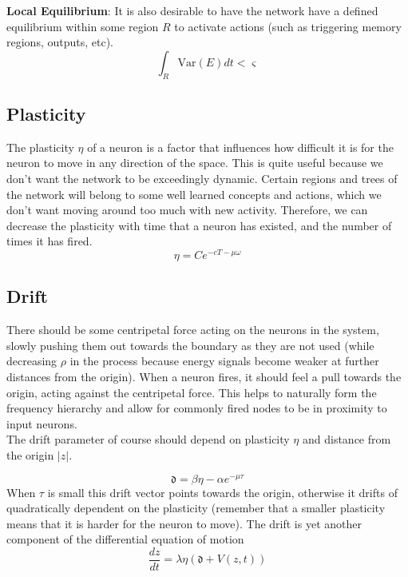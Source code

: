 \documentclass{article}
\begin{document}
\textbf{Local Equilibrium}: It is also desirable to have the network have a defined equilibrium within some region $R$ to activate actions (such as triggering memory regions, outputs, etc). 
\begin{equation}
    \int_R \text{Var}(E)dt < \varsigma
\end{equation}


\subsection{Plasticity}
The plasticity $\eta$ of a neuron is a factor that influences how difficult it is for the neuron to move in any direction of the space. This is quite useful because we don't want the network to be exceedingly dynamic. Certain regions and trees of the network will belong to some well learned concepts and actions, which we don't want moving around too much with new activity. Therefore, we can decrease the plasticity with time that a neuron has existed, and the number of times it has fired.
\begin{equation}
    \eta = Ce^{-cT - \mu \omega}
\end{equation}

\subsection{Drift}
There should be some centripetal force acting on the neurons in the system, slowly pushing them out towards the boundary as they are not used (while decreasing $\rho$ in the process because energy signals become weaker at further distances from the origin). When a neuron fires, it should feel a pull towards the origin, acting against the centripetal force. This helps to naturally form the frequency hierarchy and allow for commonly fired nodes to be in proximity to input neurons. \\

The drift parameter of course should depend on plasticity $\eta$ and distance from the origin $|z|$. 

\begin{equation}
    \mathfrak{d} = \beta\eta - \alpha e^{-\mu\tau}
\end{equation}
When $\tau$ is small this drift vector points towards the origin, otherwise it drifts of quadratically dependent on the plasticity (remember that a smaller plasticity means that it is harder for the neuron to move). The drift is yet another component of the differential equation of motion
\begin{equation}
    \frac{dz}{dt} = \lambda \eta(\mathfrak{d} + V(z,t))  
\end{equation}
\end{document}
